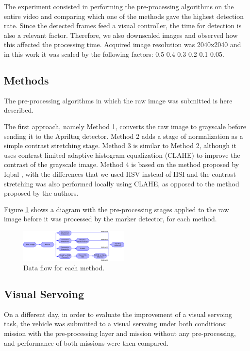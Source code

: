 \documentclass[conference, letterpaper]{IEEEtran}
\begin{document}
The experiment consisted in performing the pre-processing algorithms on the
entire video and comparing which one of the methods gave the highest detection
rate. Since the detected frames feed a visual controller, the time for
detection is also a relevant factor. Therefore, we also downscaled images and
observed how this affected the processing time. Acquired image resolution was
2040x2040 and in this work it was scaled by the following factors: 0.5 0.4 0.3 0.2
0.1 0.05.

\subsection{Methods}

The pre-processing algorithms in which the raw image was submitted is here described. 

The first approach, namely Method 1, converts the raw image to grayscale
before sending it to the Apriltag detector. Method 2 adds a stage of
normalization as a simple contrast stretching stage. Method 3 is similar to
Method 2, although it uses contrast limited adaptive histogram equalization (CLAHE)
\cite{zuiderveld1994contrast} to improve the contrast of the grayscale image.
Method 4 is based on the method proposed by Iqbal \cite{iqbal2007underwater},
with the differences that we used HSV instead of HSI and the contrast stretching was
also performed locally using CLAHE, as opposed to the method proposed by
the authors.

Figure \ref{fig:methods_flow} shows a diagram with the pre-processing stages
applied to the raw image before it was processed by the marker detector, for each
method. 

\begin{figure}[!htpb]
    \centering
    \includegraphics[width=0.49\textwidth]{./fig/processing_flow2.png}
    \caption{Data flow for each method.}
    \label{fig:methods_flow}
\end{figure}


\subsection{Visual Servoing}

On a different day, in order to evaluate the improvement of a visual servoing
task, the vehicle was submitted to a visual servoing under both conditions:
mission with the pre-processing layer and mission without any pre-processing,
and performance of both missions were then compared.
\end{document}
